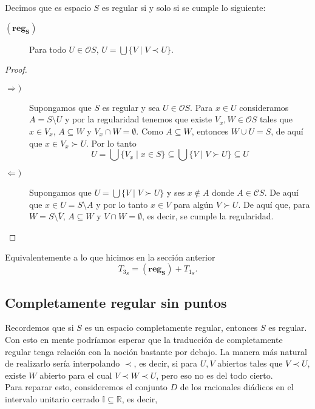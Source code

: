 \documentclass{comunicaciones}
\begin{document}
\begin{prop}
    Decimos que es espacio $S$ es regular si y solo si se cumple lo siguiente:
\begin{description}
\item[$(\mathbf{reg_S})$] Para todo  $U\in \mathcal{O}S$, $U=\bigcup\{V\mid V\prec U\}$.
\end{description}
\end{prop}

\begin{proof}
    \begin{description}
        \item[$\Rightarrow )$] Supongamos que $S$ es regular y sea $U\in \mathcal{O}S$. Para $x\in U$ consideramos $A=S\setminus U$ y por la regularidad tenemos que existe $V_x, W\in \mathcal{O}S $ tales que $x\in V_x$, $A\subseteq W$ y $V_x\cap W=\emptyset$. Como $A\subseteq W$, entonces $W\cup U=S$, de aquí que $x\in V_x\succ U$. Por lo tanto 
        \[
        U=\bigcup\{V_x\mid x\in S\}\subseteq \bigcup\{V\mid V\succ U\}\subseteq U
        \]
        \item[$\Leftarrow )$] Supongamos que $U=\bigcup\{V\mid V\succ U\}$ y ses $x\notin A$ donde $A\in \mathcal{C}S$. De aquí que $x\in U=S\setminus A$ y por lo tanto $x\in V$ para algún $V\succ U$. De aquí que, para $W=S\setminus \overline{V}$, $A\subseteq W$ y $V\cap W=\emptyset$, es decir, se cumple la regularidad. 
    \end{description}
\end{proof}

Equivalentemente a lo que hicimos en la sección anterior 
\[
T_{3_S}=(\mathbf{reg_S})+T_{1_S}.
\]

\subsection{Completamente regular sin puntos}

Recordemos que si $S$ es un espacio completamente regular, entonces $S$ es regular. Con esto en mente podríamos esperar que la traducción de completamente regular tenga relación con la noción bastante por debajo. La manera más natural de realizarlo sería interpolando $\prec$, es decir, si para $U, V$ abiertos tales que $V\prec U$, existe $W$ abierto para el cual $V\prec W \prec U$, pero eso no es del todo cierto.\\

Para reparar esto, consideremos el conjunto $D$ de los racionales diádicos en el intervalo unitario cerrado $\mathbb{I}\subseteq \mathbb{R}$, es decir,
\end{document}
